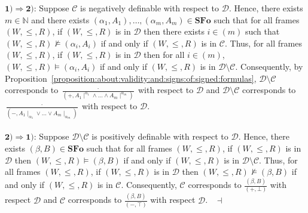 \documentclass[draft]{article}
\newenvironment{proof}{{\bf Proof:}}{~$\dashv$\\}
\def\N{\mathbb{N}}
\def\SFo{\mathbf{SFo}}
\begin{document}
\begin{proof}
%
%
$\mathbf{1){\Rightarrow}2)}$:
Suppose ${\mathcal C}$ is negatively definable with respect to ${\mathcal D}$.
Hence, there exists $m{\in}\N$ and there exists $(\alpha_{1},A_{1}),\ldots,(\alpha_{m},A_{m}){\in}\SFo$ such that for all frames $(W,{\leq},{R})$, if $(W,{\leq},{R})$ is in ${\mathcal D}$ then there exists $i{\in}(m)$ such that $(W,{\leq},{R}){\not\models}(\alpha_{i},A_{i})$ if and only if $(W,{\leq},{R})$ is in ${\mathcal C}$.
Thus, for all frames $(W,{\leq},{R})$, if $(W,{\leq},{R})$ is in ${\mathcal D}$ then for all $i{\in}(m)$, $(W,{\leq},{R}){\models}(\alpha_{i},A_{i})$ if and only if $(W,{\leq},{R})$ is in ${\mathcal D}{\setminus}{\mathcal C}$.
Consequently, by Proposition~\ref{proposition:about:validity:and:signs:of:signed:formulas}, ${\mathcal D}{\setminus}{\mathcal C}$ corresponds to $\frac{\cdot}{(+,A_{1}{\mid}^{\alpha_{1}}{\wedge}\ldots{\wedge}A_{m}{\mid}^{\alpha_{m}})}$ with respect to ${\mathcal D}$ and ${\mathcal D}{\setminus}{\mathcal C}$ corresponds to $\frac{\cdot}{(-,A_{1}{\mid}_{\alpha_{1}}{\vee}\ldots{\vee}A_{m}{\mid}_{\alpha_{m}})}$ with respect to ${\mathcal D}$.
%
%
\\
\\
%
%
$\mathbf{2){\Rightarrow}1)}$:
Suppose ${\mathcal D}{\setminus}{\mathcal C}$ is positively definable with respect to ${\mathcal D}$.
Hence, there exists $(\beta,B){\in}\SFo$ such that for all frames $(W,{\leq},{R})$, if $(W,{\leq},{R})$ is in ${\mathcal D}$ then $(W,{\leq},{R}){\models}
%
%
%
%
%
%
%
$\linebreak$
%
%
%
%
%
%
(\beta,B)$ if and only if $(W,{\leq},{R})$ is in ${\mathcal D}{\setminus}{\mathcal C}$.
Thus, for all frames $(W,{\leq},{R})$, if $(W,{\leq},{R})$ is in ${\mathcal D}$ then $(W,{\leq},{R}){\not\models}(\beta,B)$ if and only if $(W,{\leq},{R})$ is in ${\mathcal C}$.
Consequently, ${\mathcal C}$ corresponds to $\frac{(\beta,B)}{(+,{\bot})}$ with respect ${\mathcal D}$ and ${\mathcal C}$ corresponds to $\frac{(\beta,B)}{(-,{\top})}$ with respect ${\mathcal D}$.
%
%
\medskip
%
%
\end{proof}
%
%
%
%
\end{document}
